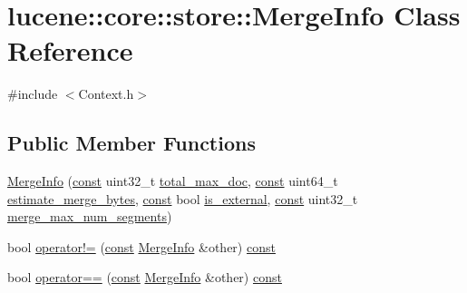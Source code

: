 \hypertarget{classlucene_1_1core_1_1store_1_1MergeInfo}{}\section{lucene\+:\+:core\+:\+:store\+:\+:Merge\+Info Class Reference}
\label{classlucene_1_1core_1_1store_1_1MergeInfo}


{\ttfamily \#include $<$Context.\+h$>$}

\subsection*{Public Member Functions}
\begin{DoxyCompactItemize}
\item 
\mbox{\hyperlink{classlucene_1_1core_1_1store_1_1MergeInfo_a3618d38701960ebb65c1e78b5cca0629}{Merge\+Info}} (\mbox{\hyperlink{ZlibCrc32_8h_a2c212835823e3c54a8ab6d95c652660e}{const}} uint32\+\_\+t \mbox{\hyperlink{classlucene_1_1core_1_1store_1_1MergeInfo_a3303509ceef1e9e04bb3e35cf6975091}{total\+\_\+max\+\_\+doc}}, \mbox{\hyperlink{ZlibCrc32_8h_a2c212835823e3c54a8ab6d95c652660e}{const}} uint64\+\_\+t \mbox{\hyperlink{classlucene_1_1core_1_1store_1_1MergeInfo_a9f174ed5a8f232b8bc250d7be60fd274}{estimate\+\_\+merge\+\_\+bytes}}, \mbox{\hyperlink{ZlibCrc32_8h_a2c212835823e3c54a8ab6d95c652660e}{const}} bool \mbox{\hyperlink{classlucene_1_1core_1_1store_1_1MergeInfo_a764f1ebeb8edd749c37939e2b88338d3}{is\+\_\+external}}, \mbox{\hyperlink{ZlibCrc32_8h_a2c212835823e3c54a8ab6d95c652660e}{const}} uint32\+\_\+t \mbox{\hyperlink{classlucene_1_1core_1_1store_1_1MergeInfo_ad54f52a5943e82fb4582c5ae54637537}{merge\+\_\+max\+\_\+num\+\_\+segments}})
\item 
bool \mbox{\hyperlink{classlucene_1_1core_1_1store_1_1MergeInfo_aa3f1f760ec304fae3dd368cd88957e84}{operator!=}} (\mbox{\hyperlink{ZlibCrc32_8h_a2c212835823e3c54a8ab6d95c652660e}{const}} \mbox{\hyperlink{classlucene_1_1core_1_1store_1_1MergeInfo}{Merge\+Info}} \&other) \mbox{\hyperlink{ZlibCrc32_8h_a2c212835823e3c54a8ab6d95c652660e}{const}}
\item 
bool \mbox{\hyperlink{classlucene_1_1core_1_1store_1_1MergeInfo_a6a0dee1b30a9ba27fa6bfd2d63adbe73}{operator==}} (\mbox{\hyperlink{ZlibCrc32_8h_a2c212835823e3c54a8ab6d95c652660e}{const}} \mbox{\hyperlink{classlucene_1_1core_1_1store_1_1MergeInfo}{Merge\+Info}} \&other) \mbox{\hyperlink{ZlibCrc32_8h_a2c212835823e3c54a8ab6d95c652660e}{const}}
\end{DoxyCompactItemize}
